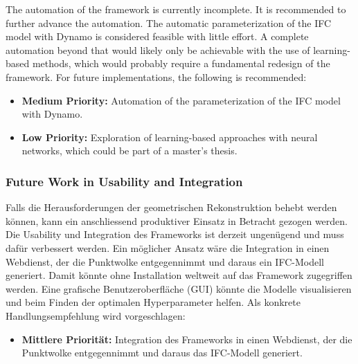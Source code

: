 \begin{English}
    The automation of the framework is currently incomplete. It is recommended to further advance the automation. The automatic parameterization of the IFC model with Dynamo is considered feasible with little effort. A complete automation beyond that would likely only be achievable with the use of learning-based methods, which would probably require a fundamental redesign of the framework. For future implementations, the following is recommended:

    \begin{itemize}
        \item \textbf{Medium Priority:} Automation of the parameterization of the IFC model with Dynamo.
        \item \textbf{Low Priority:} Exploration of learning-based approaches with neural networks, which could be part of a master's thesis.
    \end{itemize}
\end{English}

\subsubsection{Future Work in Usability and Integration}
\begin{German}
    Falls die Herausforderungen der geometrischen Rekonstruktion behebt werden können, kann ein anschliessend produktiver Einsatz in Betracht gezogen werden. Die Usability und Integration des Frameworks ist derzeit ungenügend und muss dafür verbessert werden. Ein möglicher Ansatz wäre die Integration in einen Webdienst, der die Punktwolke entgegennimmt und daraus ein IFC-Modell generiert. Damit könnte ohne Installation weltweit auf das Framework zugegriffen werden. Eine grafische Benutzeroberfläche (GUI) könnte die Modelle visualisieren und beim Finden der optimalen Hyperparameter helfen. Als konkrete Handlungsempfehlung wird vorgeschlagen:

    \begin{itemize}
        \item \textbf{Mittlere Priorität:} Integration des Frameworks in einen Webdienst, der die Punktwolke entgegennimmt und daraus das IFC-Modell generiert.
    \end{itemize}
\end{German}

